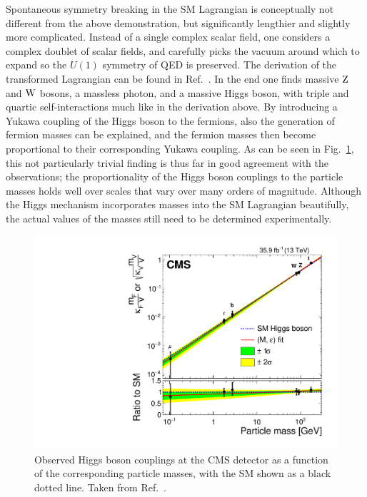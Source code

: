 Spontaneous symmetry breaking in the SM Lagrangian is conceptually not different from the above demonstration, but significantly lengthier and slightly more complicated.
% 
Instead of a single complex scalar field, one considers a complex doublet of scalar fields, and carefully picks the vacuum around which to expand so the $U(1)$ symmetry of QED is preserved.
% 
The derivation of the transformed Lagrangian can be found in Ref.~\cite{Djouadi:2005gi}.
% 
In the end one finds massive $\mathrm{Z}$ and $\mathrm{W}$ bosons, a massless photon, and a massive Higgs boson, with triple and quartic self-interactions much like in the derivation above.
% 
By introducing a Yukawa coupling of the Higgs boson to the fermions, also the generation of fermion masses can be explained, and the fermion masses then become proportional to their corresponding Yukawa coupling.
% 
% 
As can be seen in Fig.~\ref{fig:massproportion}, this not particularly trivial finding is thus far in good agreement with the observations; the proportionality of the Higgs boson couplings to the particle masses holds well over scales that vary over many orders of magnitude.
% 
Although the Higgs mechanism incorporates masses into the SM Lagrangian beautifully, the actual values of the masses still need to be determined experimentally.


\begin{figure}[hbtp]
  \begin{center}
    \includegraphics[width=\halflinewidth]{img/theory/grandcomb/massproportion.pdf}
    \caption{
        Observed Higgs boson couplings at the CMS detector as a function of the corresponding particle masses, with the SM shown as a black dotted line.
        Taken from Ref.~\cite{Sirunyan:2018koj}.
        }
    \label{fig:massproportion}
  \end{center}
\end{figure}


